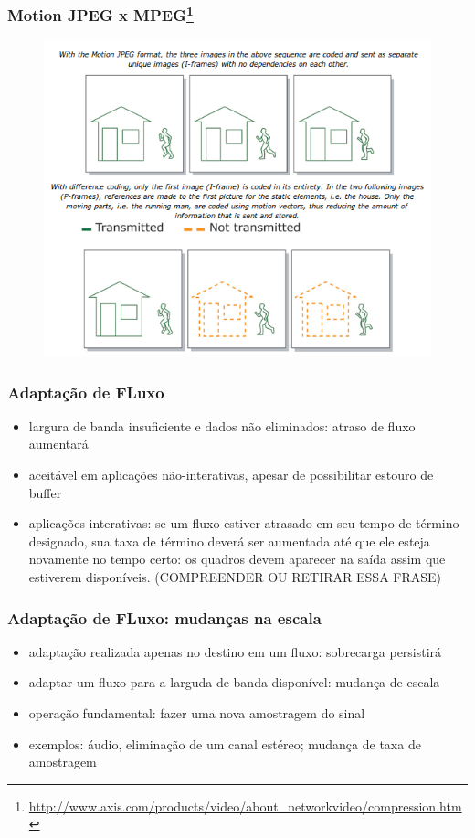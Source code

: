 \documentclass[]{beamer}
\begin{document}
\begin{frame}
 \frametitle{Motion JPEG x 
MPEG\footnote{\url{http://www.axis.com/products/video/about_networkvideo/compression.htm}}}
  \begin{figure}[hbtp]
  \begin{center}
   \includegraphics[scale=0.35]{mpeg_x_motionjpeg.png}
  \end{center}
  \end{figure}
\end{frame}


\begin{frame}
 \frametitle{Adaptação de FLuxo}
 \begin{itemize}
   \item largura de banda insuficiente e dados não eliminados: atraso de fluxo aumentará
   \item aceitável em aplicações não-interativas, apesar de possibilitar estouro de buffer
   \item aplicações interativas: se um fluxo estiver atrasado em seu tempo de término designado,
sua taxa de término deverá ser aumentada até que ele esteja novamente no tempo certo: os quadros
 devem aparecer na saída assim que estiverem disponíveis. (COMPREENDER OU RETIRAR ESSA FRASE)
  \end{itemize}
\end{frame}

\begin{frame}
 \frametitle{Adaptação de FLuxo: mudanças na escala}
 \begin{itemize}
   \item adaptação realizada apenas no destino em um fluxo: sobrecarga persistirá
   \item adaptar um fluxo para a larguda de banda disponível: mudança de escala
   \item operação fundamental: fazer uma nova amostragem do sinal
   \item exemplos: áudio, eliminação de um canal estéreo; mudança de taxa de amostragem
 \end{itemize}
\end{frame}
\end{document}
